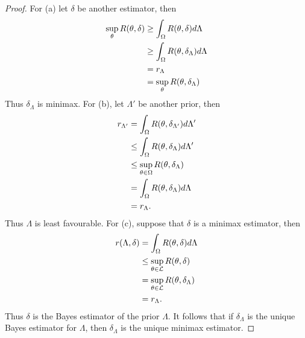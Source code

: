 \begin{proof}
    For (a) let $\delta$ be another estimator, then 
    \begin{align*}
        \sup_{\theta} R({\theta},\delta) & \ge \int_{{\Omega}} R({\theta},\delta)d\Lambda \\
        &\ge \int_{{\Omega}} R({\theta}, \delta_\Lambda)d\Lambda \\
        &= r_\Lambda\\
        &= \sup_{\theta} R({\theta},\delta_\Lambda)
    \end{align*}
    Thus $\delta_\Lambda$ is minimax. For (b), let $\Lambda'$ be another prior, then
    \begin{align*}
        r_{\Lambda'} & = \int_{{\Omega}} R({\theta}, \delta_{\Lambda'})d\Lambda'\\
        &\le \int_{{\Omega}} R({\theta}, \delta_{\Lambda})d\Lambda'\\
        &\le \sup_{{\theta} \in {{\Omega}}} R({\theta}, \delta_{\Lambda})\\
        &= \int_{{\Omega}} R({\theta}, \delta_{\Lambda})d\Lambda\\
        &= r_\Lambda.
    \end{align*}
    Thus $\Lambda$ is least favourable. For (c), suppose that $\delta$ is a minimax estimator, then 
    \begin{align*}
        r(\Lambda, \delta) &=\int_{{{\Omega}}} R({\theta}, \delta)d\Lambda \\
        &\le \sup_{{\theta} \in {\mathcal{L}}} R({\theta},\delta)\\
        &= \sup_{{\theta} \in {\mathcal{L}}}R({\theta},\delta_{\Lambda})\\
        &=r_{\Lambda}.
    \end{align*}
    Thus $\delta$ is the Bayes estimator of the prior $\Lambda$. It follows that if $\delta_{\Lambda}$ is the unique Bayes estimator for $\Lambda$, then $\delta_{\Lambda}$ is the unique minimax estimator.
\end{proof}
